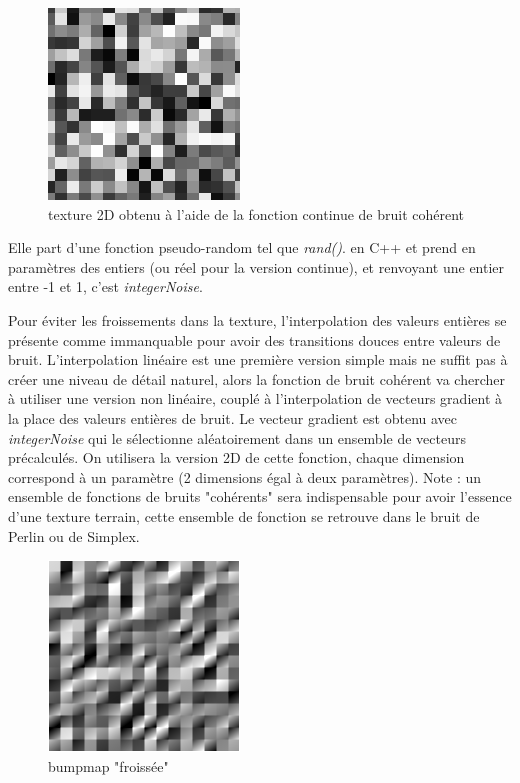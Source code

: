 \documentclass[12pt]{report}
\begin{document}
\begin{enumerate}
    \begin{figure}[h]
        \centering
        \includegraphics[scale = 0.5]{images/continuousintnoise2d.png}
        \caption{texture 2D obtenu à l'aide de la fonction continue de bruit cohérent}
    \end{figure}
    
    Elle part d'une fonction pseudo-random tel que \textit{rand()}. en C++ et prend en paramètres des entiers (ou réel pour la version continue), et renvoyant une entier entre -1 et 1, c'est \textit{integerNoise}.
    
    Pour éviter les froissements dans la texture, l'interpolation des valeurs entières se présente comme immanquable pour avoir des transitions douces entre valeurs de bruit. L'interpolation linéaire est une première version simple mais ne suffit pas à créer une niveau de détail naturel, alors la fonction de bruit cohérent va chercher à utiliser une version non linéaire, couplé à l'interpolation de vecteurs gradient à la place des valeurs entières de bruit. Le vecteur gradient est obtenu avec \textit{integerNoise} qui le sélectionne aléatoirement dans un ensemble de vecteurs précalculés. On utilisera la version 2D de cette fonction, chaque dimension correspond à un paramètre (2 dimensions égal à deux paramètres).
    Note : un ensemble de fonctions de bruits "cohérents" sera indispensable pour avoir l'essence d'une texture terrain, cette ensemble de fonction se retrouve dans le bruit de Perlin ou de Simplex.
    
     \begin{figure}[h]
        \centering
        \includegraphics[scale = 0.7]{images/bumpvalue.png}
        \caption{bumpmap "froissée"}
    \end{figure}
    

\end{enumerate}
\end{document}
